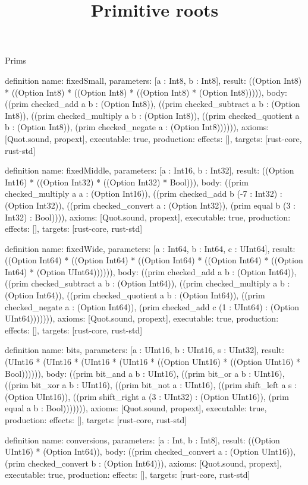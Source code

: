 \begin{lexlean}{Prims}
\title{Primitive roots}
\begin{semanticmodule}
definition{
  name: fixedSmall,
  parameters: [a : Int8, b : Int8],
  result: ((Option Int8) * ((Option Int8) * ((Option Int8) * ((Option Int8) * (Option Int8))))),
  body: ((prim checked_add a b : (Option Int8)), ((prim checked_subtract a b : (Option Int8)), ((prim checked_multiply a b : (Option Int8)), ((prim checked_quotient a b : (Option Int8)), (prim checked_negate a : (Option Int8)))))),
  axioms: [Quot.sound, propext],
  executable: true,
  production: {effects: [], targets: [rust-core, rust-std]}
}

definition{
  name: fixedMiddle,
  parameters: [a : Int16, b : Int32],
  result: ((Option Int16) * ((Option Int32) * ((Option Int32) * Bool))),
  body: ((prim checked_multiply a a : (Option Int16)), ((prim checked_add b (-7 : Int32) : (Option Int32)), ((prim checked_convert a : (Option Int32)), (prim equal b (3 : Int32) : Bool)))),
  axioms: [Quot.sound, propext],
  executable: true,
  production: {effects: [], targets: [rust-core, rust-std]}
}

definition{
  name: fixedWide,
  parameters: [a : Int64, b : Int64, c : UInt64],
  result: ((Option Int64) * ((Option Int64) * ((Option Int64) * ((Option Int64) * ((Option Int64) * (Option UInt64)))))),
  body: ((prim checked_add a b : (Option Int64)), ((prim checked_subtract a b : (Option Int64)), ((prim checked_multiply a b : (Option Int64)), ((prim checked_quotient a b : (Option Int64)), ((prim checked_negate a : (Option Int64)), (prim checked_add c (1 : UInt64) : (Option UInt64))))))),
  axioms: [Quot.sound, propext],
  executable: true,
  production: {effects: [], targets: [rust-core, rust-std]}
}

definition{
  name: bits,
  parameters: [a : UInt16, b : UInt16, s : UInt32],
  result: (UInt16 * (UInt16 * (UInt16 * (UInt16 * ((Option UInt16) * ((Option UInt16) * Bool)))))),
  body: ((prim bit_and a b : UInt16), ((prim bit_or a b : UInt16), ((prim bit_xor a b : UInt16), ((prim bit_not a : UInt16), ((prim shift_left a s : (Option UInt16)), ((prim shift_right a (3 : UInt32) : (Option UInt16)), (prim equal a b : Bool))))))),
  axioms: [Quot.sound, propext],
  executable: true,
  production: {effects: [], targets: [rust-core, rust-std]}
}

definition{
  name: conversions,
  parameters: [a : Int, b : Int8],
  result: ((Option UInt16) * (Option Int64)),
  body: ((prim checked_convert a : (Option UInt16)), (prim checked_convert b : (Option Int64))),
  axioms: [Quot.sound, propext],
  executable: true,
  production: {effects: [], targets: [rust-core, rust-std]}
}


\end{semanticmodule}
\end{lexlean}
